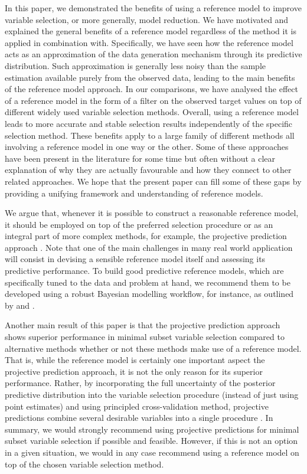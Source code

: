 \documentclass[a4]{article}
\theoremstyle{definition}
\begin{document}
In this paper, we demonstrated the benefits of using a reference model
to improve variable selection, or more generally, model reduction. 
We have motivated and explained the general benefits
of a reference model regardless of the method it is applied in combination
with. Specifically, we have seen how the reference model acts as an
approximation of the data generation mechanism through its predictive
distribution. Such approximation is generally less noisy than the
sample estimation available purely from the observed data, leading to
the main benefits of the reference model approach. In our comparisons,
we have analysed the effect of a reference model in the form of a
filter on the observed target values on top of different widely used
variable selection methods. Overall, using a reference model leads to
more accurate and stable selection results independently of the
specific selection method. These benefits apply to a large family of
different methods all involving a reference model in one way or the
other. Some of these approaches have been present in the literature for some time
\cite[e.g., see references in][]{vehtari2012survey,paper:projpred}
but often without a clear explanation of {why} they are actually
favourable and how they connect to other related approaches. We hope
that the present paper can fill some of these gaps by providing a
unifying framework and understanding of reference models.

We argue that, whenever it is possible to construct a reasonable
reference model, it should be employed on top of the preferred
selection procedure or as an integral part of more complex methods,
for example, the projective prediction approach
\citep{paper:projpred}. Note that one of the main challenges in many
real world application will consist in devising a sensible reference
model itself and assessing its predictive performance.
To build good predictive reference models, which are specifically
tuned to the data and problem at hand, we recommend them to be
developed using a robust Bayesian modelling workflow, for instance, as
outlined by \citet{gelman2013bayesian} and \citet{gabry2019visualization}.

Another main result of this paper is that the projective prediction
approach shows superior performance in minimal subset variable
selection compared to alternative methods whether or not these methods
make use of a reference model. That is, while the reference model is
certainly one important aspect the projective prediction approach, it
is not the only reason for its superior performance.  Rather, by
incorporating the full uncertainty of the posterior predictive
distribution into the variable selection procedure (instead of just
using point estimates) and using principled cross-validation method,
projective predictions combine several desirable variables into a
single procedure \citep{paper:projpred}.  In summary, we would
strongly recommend using projective predictions for minimal subset
 variable selection if possible and feasible. 
 However, if this is not an option in a given
situation, we would in any case recommend using a reference model on
top of the chosen variable selection method.
\end{document}

